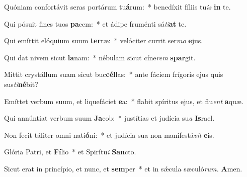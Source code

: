\item Quóniam confortávit seras portárum tu\textbf{á}rum:~* benedíxit fíliis tu\hspace{0.03em}\textit{is} \textbf{in} te.
\item Qui pósuit fines tuos \textbf{pa}cem:~* et ádipe fruménti sá\hspace{0.03em}\textit{ti}\textbf{at} te.
\item Qui emíttit elóquium suum \textbf{ter}ræ:~* velóciter currit ser\textit{mo} \textbf{e}jus.
\item Qui dat nivem sicut \textbf{la}nam:~* nébulam sicut cíne\hspace{0.03em}\textit{rem} \textbf{spar}git.
\item Mittit crystállum suam sicut buc\textbf{cél}las:~* ante fáciem frígoris ejus quis sus\-\hspace{0.03em}\textit{ti}\textbf{né}bit?
\item Emíttet verbum suum, et liquefáciet \textbf{e}a:~* flabit spíritus ejus, et flu\hspace{0.03em}\textit{ent} \textbf{a}quæ.
\item Qui annúntiat verbum suum \textbf{Ja}cob:~* justítias et judícia su\hspace{0.03em}\textit{a} \textbf{Is}rael.
\item Non fecit táliter omni nati\textbf{ó}ni:~* et judícia sua non manife\-stá\hspace{0.03em}\textit{vit} \textbf{e}is.
\item Glória Patri, et \textbf{Fí}lio~* et Spirítu\hspace{0.03em}\textit{i} \textbf{San}cto.
\item Sicut erat in princípio, et nunc, et \textbf{sem}per~* et in sǽcula sæculó\textit{rum.} \textbf{A}men.
